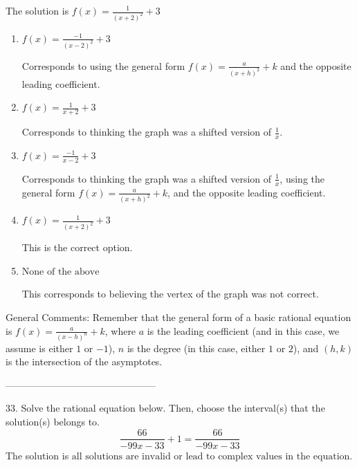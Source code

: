 \documentclass{extbook}[14pt]
\begin{document}
The solution is $ f(x) = \frac{1}{(x + 2)^2} + 3 $ 

\begin{enumerate}[label=\Alph*.] 
\item $ f(x) = \frac{-1}{(x - 2)^2} + 3 $ 

 Corresponds to using the general form $f(x) = \frac{a}{(x+h)^2}+k$ and the opposite leading coefficient. 
\item $ f(x) = \frac{1}{x + 2} + 3 $ 

 Corresponds to thinking the graph was a shifted version of $\frac{1}{x}$. 
\item $ f(x) = \frac{-1}{x - 2} + 3 $ 

 Corresponds to thinking the graph was a shifted version of $\frac{1}{x}$, using the general form $f(x) = \frac{a}{(x+h)^2}+k$, and the opposite leading coefficient. 
\item $ f(x) = \frac{1}{(x + 2)^2} + 3 $ 

 This is the correct option. 
\item $ \text{None of the above} $ 

 This corresponds to believing the vertex of the graph was not correct. 
\end{enumerate} 
 
General Comments: Remember that the general form of a basic rational equation is $ f(x) = \frac{a}{(x-h)^n} + k$, where $a$ is the leading coefficient (and in this case, we assume is either $1$ or $-1$), $n$ is the degree (in this case, either $1$ or $2$), and $(h, k)$ is the intersection of the asymptotes.

-----------------------------------------------

33. Solve the rational equation below. Then, choose the interval(s) that the solution(s) belongs to.
\[ \frac{66}{-99x -33} + 1 = \frac{66}{-99x -33} \] 
The solution is $ \text{all solutions are invalid or lead to complex values in the equation.} $ 
\end{document}
